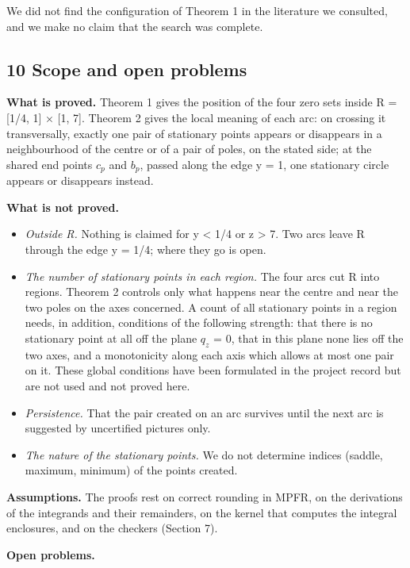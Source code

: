 \documentclass[
  11pt,
]{article}
\providecommand{\tightlist}{%
  \setlength{\itemsep}{0pt}\setlength{\parskip}{0pt}}
\begin{document}
We did not find the configuration of Theorem 1 in the literature we
consulted, and we make no claim that the search was complete.

\subsection{10 Scope and open problems}

\textbf{What is proved.} Theorem 1 gives the position of the four zero
sets inside R = {[}1/4, 1{]} × {[}1, 7{]}. Theorem 2 gives the local
meaning of each arc: on crossing it transversally, exactly one pair of
stationary points appears or disappears in a neighbourhood of the centre
or of a pair of poles, on the stated side; at the shared end points
\(c_{p}\) and \(b_{p}\), passed along the edge y = 1, one stationary
circle appears or disappears instead.

\textbf{What is not proved.}

\begin{itemize}
\tightlist
\item
  \emph{Outside R.} Nothing is claimed for y \textless{} 1/4 or z
  \textgreater{} 7. Two arcs leave R through the edge y = 1/4; where
  they go is open.
\item
  \emph{The number of stationary points in each region.} The four arcs
  cut R into regions. Theorem 2 controls only what happens near the
  centre and near the two poles on the axes concerned. A count of all
  stationary points in a region needs, in addition, conditions of the
  following strength: that there is no stationary point at all off the
  plane \(q_{z}\) = 0, that in this plane none lies off the two axes,
  and a monotonicity along each axis which allows at most one pair on
  it. These global conditions have been formulated in the project record
  but are not used and not proved here.
\item
  \emph{Persistence.} That the pair created on an arc survives until the
  next arc is suggested by uncertified pictures only.
\item
  \emph{The nature of the stationary points.} We do not determine
  indices (saddle, maximum, minimum) of the points created.
\end{itemize}

\textbf{Assumptions.} The proofs rest on correct rounding in MPFR, on
the derivations of the integrands and their remainders, on the kernel
that computes the integral enclosures, and on the checkers (Section 7).

\textbf{Open problems.}
\end{document}
